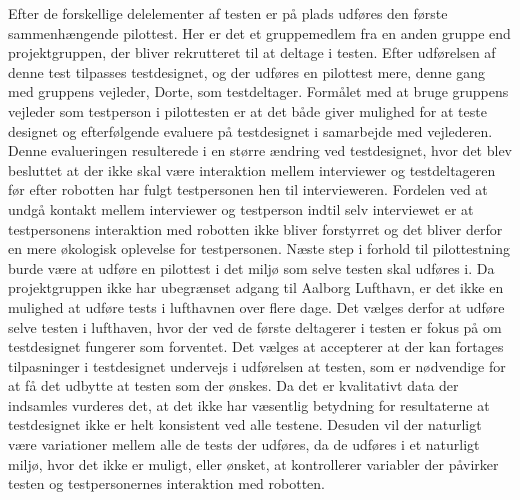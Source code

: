 Efter de forskellige delelementer af testen er på plads udføres den første sammenhængende pilottest. Her er det et gruppemedlem fra en anden gruppe end projektgruppen, der bliver rekrutteret til at deltage i testen. Efter udførelsen af denne test tilpasses testdesignet, og der udføres en pilottest mere, denne gang med gruppens vejleder, Dorte, som testdeltager. Formålet med at bruge gruppens vejleder som testperson i pilottesten er at det både giver mulighed for at teste designet og efterfølgende evaluere på testdesignet i samarbejde med vejlederen. Denne evalueringen resulterede i en større ændring ved testdesignet, hvor det blev besluttet at der ikke skal være interaktion mellem interviewer og testdeltageren før efter robotten har fulgt testpersonen hen til intervieweren. Fordelen ved at undgå kontakt mellem interviewer og testperson indtil selv interviewet er at testpersonens interaktion med robotten ikke bliver forstyrret og det bliver derfor en mere økologisk oplevelse for testpersonen. \blankline
%
Næste step i forhold til pilottestning burde være at udføre en pilottest i det miljø som selve testen skal udføres i. Da projektgruppen ikke har ubegrænset adgang til Aalborg Lufthavn, er det ikke en mulighed at udføre tests i lufthavnen over flere dage. Det vælges derfor at udføre selve testen i lufthaven, hvor der ved de første deltagerer i testen er fokus på om testdesignet fungerer som forventet. Det vælges at accepterer at der kan fortages tilpasninger i testdesignet undervejs i udførelsen at testen, som er nødvendige for at få det udbytte at testen som der ønskes. Da det er kvalitativt data der indsamles vurderes det, at det ikke har væsentlig betydning for resultaterne at testdesignet ikke er helt konsistent ved alle testene. Desuden vil der naturligt være variationer mellem alle de tests der udføres, da de udføres i et naturligt miljø, hvor det ikke er muligt, eller ønsket, at kontrollerer variabler der påvirker testen og testpersonernes interaktion med robotten. 


